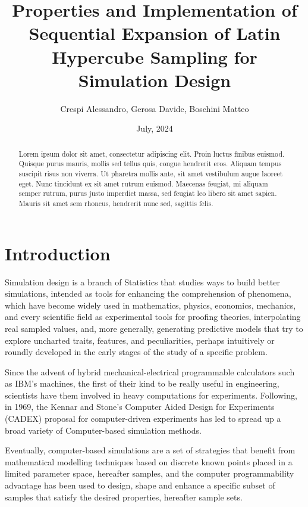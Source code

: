 \documentclass[12pt]{article}
\begin{document}
\title{Properties and Implementation of Sequential Expansion of Latin Hypercube Sampling for Simulation Design}
\author{Crespi Alessandro, Gerosa Davide, Boschini Matteo}
\date{July, 2024}
\maketitle

\tableofcontents
\pagebreak

\begin{abstract}
Lorem ipsum dolor sit amet, consectetur adipiscing elit. Proin luctus finibus euismod. Quisque purus mauris, mollis sed tellus quis, congue hendrerit eros. Aliquam tempus suscipit risus non viverra. Ut pharetra mollis ante, sit amet vestibulum augue laoreet eget. Nunc tincidunt ex sit amet rutrum euismod. Maecenas feugiat, mi aliquam semper rutrum, purus justo imperdiet massa, sed feugiat leo libero sit amet sapien. Mauris sit amet sem rhoncus, hendrerit nunc sed, sagittis felis. 
\end{abstract}


\section{Introduction}
Simulation design is a branch of Statistics that studies ways to build better simulations, intended as tools for enhancing the comprehension of phenomena, which have become widely used in mathematics, physics, economics, mechanics, and every scientific field as experimental tools for proofing theories, interpolating real sampled values, and, more generally, generating predictive models that try to explore uncharted traits, features, and peculiarities, perhaps intuitively or roundly developed in the early stages of the study of a specific problem.

Since the advent of hybrid mechanical-electrical programmable calculators such as IBM's machines, the first of their kind to be really useful in engineering, scientists have them involved in heavy computations for experiments. Following, in 1969, the Kennar and Stone's Computer Aided Design for Experiments (CADEX) proposal for computer-driven experiments has led to spread up a broad variety of Computer-based simulation methods.

Eventually, computer-based simulations are a set of strategies that benefit from mathematical modelling techniques based on discrete known points placed in a limited parameter space, hereafter samples, and the computer programmability advantage has been used to design, shape and enhance a specific subset of samples that satisfy the desired properties, hereafter sample sets. 
\end{document}
